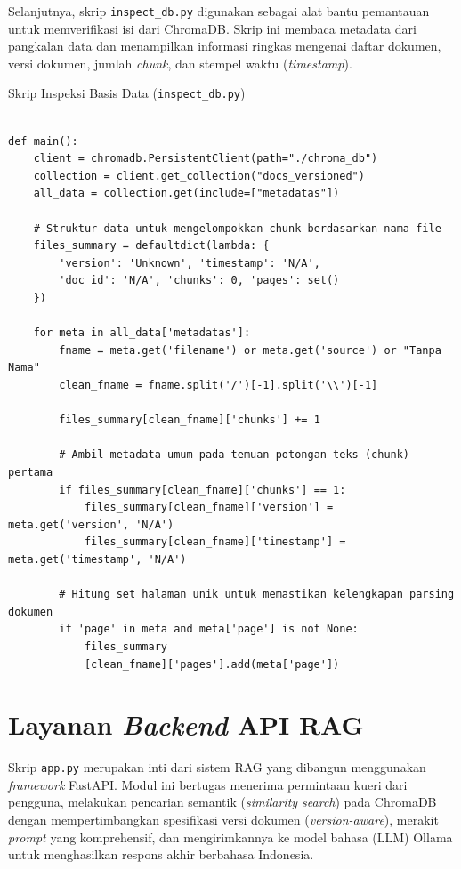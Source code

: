 Selanjutnya, skrip \texttt{inspect\_db.py} digunakan sebagai alat bantu pemantauan untuk memverifikasi isi dari ChromaDB. Skrip ini membaca metadata dari pangkalan data dan menampilkan informasi ringkas mengenai daftar dokumen, versi dokumen, jumlah \textit{chunk}, dan stempel waktu (\textit{timestamp}).

\begin{myblock}{Skrip Inspeksi Basis Data (\texttt{inspect\_db.py})}\label{kode:inspect}
\begin{verbatim}

def main():
    client = chromadb.PersistentClient(path="./chroma_db")
    collection = client.get_collection("docs_versioned")
    all_data = collection.get(include=["metadatas"])
    
    # Struktur data untuk mengelompokkan chunk berdasarkan nama file
    files_summary = defaultdict(lambda: {
        'version': 'Unknown', 'timestamp': 'N/A', 
        'doc_id': 'N/A', 'chunks': 0, 'pages': set()
    })

    for meta in all_data['metadatas']:
        fname = meta.get('filename') or meta.get('source') or "Tanpa Nama"
        clean_fname = fname.split('/')[-1].split('\\')[-1]

        files_summary[clean_fname]['chunks'] += 1
        
        # Ambil metadata umum pada temuan potongan teks (chunk) pertama
        if files_summary[clean_fname]['chunks'] == 1:
            files_summary[clean_fname]['version'] = meta.get('version', 'N/A')
            files_summary[clean_fname]['timestamp'] = meta.get('timestamp', 'N/A')
        
        # Hitung set halaman unik untuk memastikan kelengkapan parsing dokumen
        if 'page' in meta and meta['page'] is not None:
            files_summary
            [clean_fname]['pages'].add(meta['page'])

\end{verbatim}
\end{myblock}

\section{Layanan \textit{Backend} API RAG}

Skrip \texttt{app.py} merupakan inti dari sistem RAG yang dibangun menggunakan \textit{framework} FastAPI. Modul ini bertugas menerima permintaan kueri dari pengguna, melakukan pencarian semantik (\textit{similarity search}) pada ChromaDB dengan mempertimbangkan spesifikasi versi dokumen (\textit{version-aware}), merakit \textit{prompt} yang komprehensif, dan mengirimkannya ke model bahasa (LLM) Ollama untuk menghasilkan respons akhir berbahasa Indonesia.

